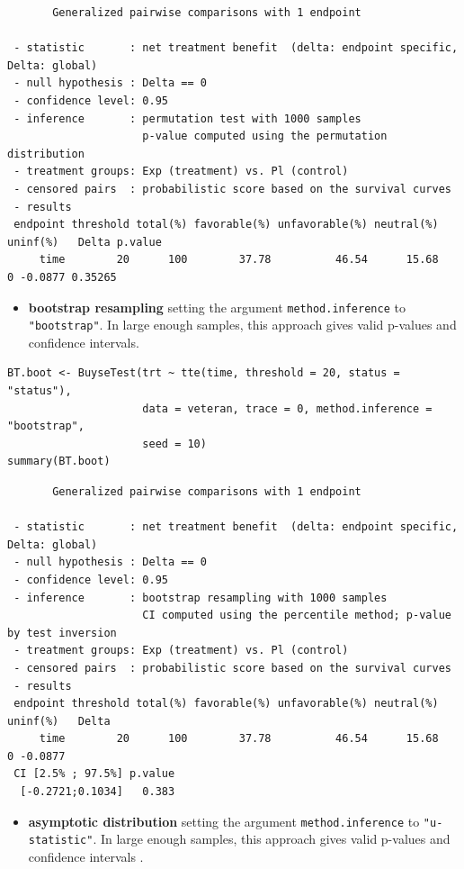 \documentclass[12pt]{article}
\begin{document}
\begin{verbatim}
       Generalized pairwise comparisons with 1 endpoint

 - statistic       : net treatment benefit  (delta: endpoint specific, Delta: global) 
 - null hypothesis : Delta == 0 
 - confidence level: 0.95 
 - inference       : permutation test with 1000 samples 
                     p-value computed using the permutation distribution 
 - treatment groups: Exp (treatment) vs. Pl (control) 
 - censored pairs  : probabilistic score based on the survival curves
 - results
 endpoint threshold total(%) favorable(%) unfavorable(%) neutral(%) uninf(%)   Delta p.value 
     time        20      100        37.78          46.54      15.68        0 -0.0877 0.35265
\end{verbatim}

\begin{itemize}
\item \textbf{bootstrap resampling} setting the argument \texttt{method.inference} to
\texttt{"bootstrap"}. In large enough samples, this approach gives valid
p-values and confidence intervals.
\end{itemize}

\lstset{language=r,label= ,caption= ,captionpos=b,numbers=none}
\begin{lstlisting}
BT.boot <- BuyseTest(trt ~ tte(time, threshold = 20, status = "status"),
                     data = veteran, trace = 0, method.inference = "bootstrap",
                     seed = 10) 
summary(BT.boot)
\end{lstlisting}

\begin{verbatim}
       Generalized pairwise comparisons with 1 endpoint

 - statistic       : net treatment benefit  (delta: endpoint specific, Delta: global) 
 - null hypothesis : Delta == 0 
 - confidence level: 0.95 
 - inference       : bootstrap resampling with 1000 samples 
                     CI computed using the percentile method; p-value by test inversion 
 - treatment groups: Exp (treatment) vs. Pl (control) 
 - censored pairs  : probabilistic score based on the survival curves
 - results
 endpoint threshold total(%) favorable(%) unfavorable(%) neutral(%) uninf(%)   Delta
     time        20      100        37.78          46.54      15.68        0 -0.0877
 CI [2.5% ; 97.5%] p.value 
  [-0.2721;0.1034]   0.383
\end{verbatim}

\begin{itemize}
\item \textbf{asymptotic distribution} setting the argument \texttt{method.inference} to
\texttt{"u-statistic"}. In large enough samples, this approach gives valid
p-values and confidence intervals \citep{ozenne2021asymptotic}.
\end{itemize}
\end{document}

